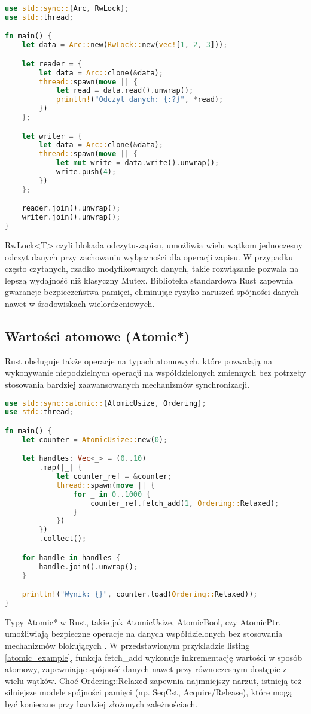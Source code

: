 \begin{lstlisting}[language=Rust, caption=Przykład użycia RwLock, label=rwlock_example]
use std::sync::{Arc, RwLock};
use std::thread;

fn main() {
    let data = Arc::new(RwLock::new(vec![1, 2, 3]));

    let reader = {
        let data = Arc::clone(&data);
        thread::spawn(move || {
            let read = data.read().unwrap();
            println!("Odczyt danych: {:?}", *read);
        })
    };

    let writer = {
        let data = Arc::clone(&data);
        thread::spawn(move || {
            let mut write = data.write().unwrap();
            write.push(4);
        })
    };

    reader.join().unwrap();
    writer.join().unwrap();
}
\end{lstlisting}
RwLock<T>  czyli blokada odczytu-zapisu, umożliwia wielu wątkom jednoczesny odczyt danych przy zachowaniu wyłączności dla operacji zapisu. W przypadku często czytanych, rzadko modyfikowanych danych, takie rozwiązanie pozwala na lepszą wydajność niż klasyczny Mutex. Biblioteka standardowa Rust zapewnia gwarancje bezpieczeństwa pamięci, eliminując ryzyko naruszeń spójności danych nawet w środowiskach wielordzeniowych.  
\subsection{Wartości atomowe (Atomic*)}

Rust obsługuje także operacje na typach atomowych, które pozwalają na wykonywanie niepodzielnych operacji na współdzielonych zmiennych bez potrzeby stosowania bardziej zaawansowanych mechanizmów synchronizacji.

\begin{lstlisting}[language=Rust, caption=Przykład użycia Atomic, label=atomic_example]
use std::sync::atomic::{AtomicUsize, Ordering};
use std::thread;

fn main() {
    let counter = AtomicUsize::new(0);

    let handles: Vec<_> = (0..10)
        .map(|_| {
            let counter_ref = &counter;
            thread::spawn(move || {
                for _ in 0..1000 {
                    counter_ref.fetch_add(1, Ordering::Relaxed);
                }
            })
        })
        .collect();

    for handle in handles {
        handle.join().unwrap();
    }

    println!("Wynik: {}", counter.load(Ordering::Relaxed));
}
\end{lstlisting}
Typy Atomic* w Rust, takie jak AtomicUsize, AtomicBool, czy AtomicPtr, umożliwiają bezpieczne operacje na danych współdzielonych bez stosowania mechanizmów blokujących . W przedstawionym przykładzie listing \ref{atomic_example}, funkcja fetch\_add wykonuje inkrementację wartości w sposób atomowy, zapewniając spójność danych nawet przy równoczesnym dostępie z wielu wątków. Choć Ordering::Relaxed zapewnia najmniejszy narzut, istnieją też silniejsze modele spójności pamięci (np. SeqCst, Acquire/Release), które mogą być konieczne przy bardziej złożonych zależnościach.

